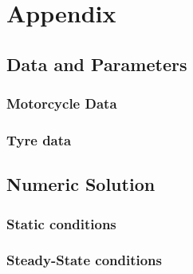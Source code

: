 \appendix
\chapter*{Appendix}
%
\section*{Data and Parameters}
%
\subsection*{Motorcycle Data}
%
\subsection*{Tyre data}
%

\section*{Numeric Solution}
%
\subsection*{Static conditions}
%
\subsection*{Steady-State conditions}
%
